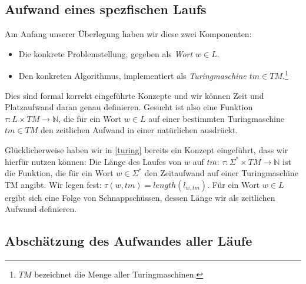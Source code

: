 \subsection{Aufwand eines spezfischen Laufs}
Am Anfang unserer Überlegung haben wir diese zwei Komponenten:
\begin{itemize}
    \item Die konkrete Problemstellung, gegeben als \emph{Wort $w \in L$}.
    \item Den konkreten Algorithmus,
        implementiert als \emph{Turingmaschine $tm \in TM$}.\footnote{
            $TM$ bezeichnet die Menge aller Turingmaschinen.}
\end{itemize}
Dies sind formal korrekt eingeführte Konzepte
und wir können Zeit und Platzaufwand daran genau definieren.
Gesucht ist also eine Funktion $\tau: L \times TM \rightarrow \mathbb{N}$,
die für ein Wort $w \in L$ auf einer bestimmten Turingmaschine $tm \in TM$
den zeitlichen Aufwand in einer natürlichen ausdrückt.

Glücklicherweise haben wir in \autoref{turing} bereits ein Konzept eingeführt,
dass wir hierfür nutzen können:
Die Länge des Laufes von $w$ auf $tm$:
$\tau: \Sigma^* \times TM \rightarrow \mathbb{N}$ ist die Funktion,
die für ein Wort $w \in \Sigma^*$ den Zeitaufwand auf einer Turingmaschine TM angibt.
Wir legen fest: $\tau(w,tm) =  length(l_{w,tm})$.
Für ein Wort $w \in L$ ergibt sich eine Folge von Schnappschüssen,
dessen Länge wir als zeitlichen Aufwand definieren.

\subsection{Abschätzung des Aufwandes aller Läufe}

